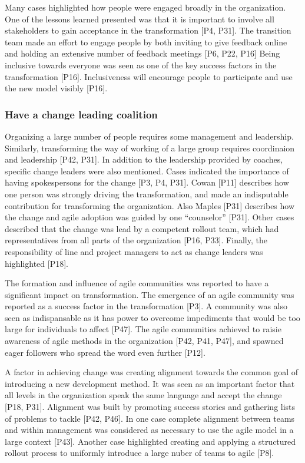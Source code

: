 \documentclass[preprint,authoryear,12pt]{elsarticle}
\begin{document}
Many cases highlighted how people were engaged broadly in the organization.
One of the lessons learned presented was that it is important to involve all
stakeholders to gain acceptance in the transformation [P4, P31]. The transition
team made an effort to engage people by both inviting to give feedback online
and holding an extensive number of feedback meetings [P6, P22, P16]
Being inclusive towards everyone was seen as one of the key success factors in
the transformation [P16]. Inclusiveness will encourage people to participate and
use the new model visibly [P16].


\subsubsection{Have a change leading coalition}

Organizing a large number of people requires some management and leadership.
Similarly, transforming the way of working of a large group requires coordinaion
and leadership [P42, P31]. In addition to the leadership provided by coaches,
specific change leaders were also mentioned. Cases indicated the importance of
having spokespersons for the change [P3, P4, P31]. Cowan [P11] describes how one
person was strongly driving the transformation, and made an indisputable
contribution for transforming the organization. Also Maples [P31] describes how
the change and agile adoption was guided by one ``counselor'' [P31]. Other cases
described that the change was lead by a competent rollout team, which had
representatives from all parts of the organization [P16, P33]. Finally, the
responsibility of line and project managers to act as change leaders was
highlighted [P18].

The formation and influence of agile communities was reported to have a
significant impact on transformation.
The emergence of an agile community was reported as a success factor in the
transformation [P3]. A community was also seen as indispansable as it has power
to overcome impediments that would be too large for individuals to affect [P47].
The agile communities achieved to raisie awareness of agile methods in the
organization [P42, P41, P47], and spawned eager followers who spread the word
even further [P12].

A factor in achieving change was creating alignment towards the common goal of
introducing a new development method. It was seen as an important factor that
all levels in the organization speak the same language and accept the change
[P18, P31]. Alignment was built by promoting success stories and gathering lists
of problems to tackle [P42, P46]. In one case complete alignment between teams
and within management was considered as necessary to use the agile model in a
large context [P43]. Another case highlighted creating and applying a structured
rollout process to uniformly introduce a large nuber of teams to agile [P8].
\end{document}
